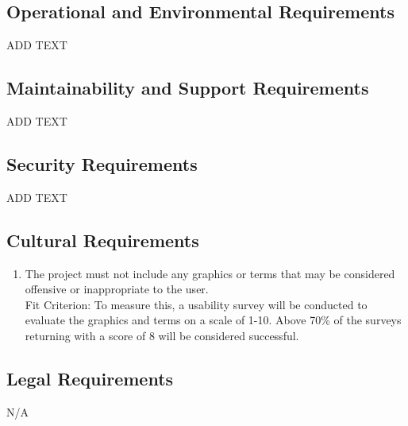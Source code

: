 \documentclass[12pt, titlepage]{article}
\begin{document}
\subsection{Operational and Environmental Requirements}
\begin{adjustwidth}{2.2em}{0pt}
\begin{enumerate}[{NFR-O}1.]
    ADD TEXT
    
\end{enumerate}
\end{adjustwidth}

\subsection{Maintainability and Support Requirements}
\begin{adjustwidth}{2.2em}{0pt}
\begin{enumerate}[{NFR-M}1.]
    ADD TEXT
\end{enumerate} 
\end{adjustwidth}

\subsection{Security Requirements}
\begin{adjustwidth}{2.0em}{0pt}
\begin{enumerate}[{NFR-S}1.]
    ADD TEXT
\end{enumerate}
\end{adjustwidth}

\subsection{Cultural Requirements}
\begin{adjustwidth}{2.2em}{0pt}
\begin{enumerate}[{NFR-C}1.]
    \item The project must not include any graphics or terms that may be considered offensive or inappropriate to the user.\\
    Fit Criterion: To measure this, a usability survey will be conducted to evaluate the graphics and terms on a scale of 1-10. Above 70\% of the surveys returning with a score of 8 will be considered successful.
\end{enumerate}
\end{adjustwidth}

\subsection{Legal Requirements}
\begin{adjustwidth}{2.7em}{0pt}
\begin{enumerate}[{NFR-LR}1.]
    N/A
\end{enumerate}
\end{adjustwidth}
\end{document}
